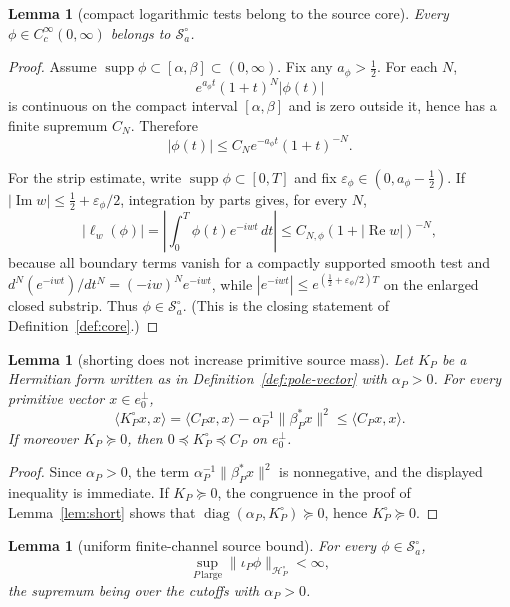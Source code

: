 \documentclass[11pt]{amsart}
\newtheorem{lemma}[theorem]{Lemma}
\theoremstyle{definition}
\theoremstyle{remark}
\theoremstyle{definition}
\renewcommand{\Re}{\operatorname{Re}}
\renewcommand{\Im}{\operatorname{Im}}
\newcommand{\half}{\tfrac{1}{2}}
\newcommand{\eps}{\varepsilon}
\newcommand{\cH}{\mathcal{H}}
\newcommand{\cS}{\mathcal{S}}
\begin{document}
\begin{lemma}[compact logarithmic tests belong to the source core]\label{lem:compact-core}
Every $\phi\in C_c^\infty(0,\infty)$ belongs to $\cS_a^\circ$.
\end{lemma}

\begin{proof}
Assume $\operatorname{supp}\phi\subset[\alpha,\beta]\subset(0,\infty)$.  Fix any
$a_\phi>\half$.  For each $N$,
\[
   e^{a_\phi t}(1+t)^N|\phi(t)|
\]
is continuous on the compact interval $[\alpha,\beta]$ and is zero outside it, hence has a finite
supremum $C_N$.  Therefore
\[
   |\phi(t)|\le C_Ne^{-a_\phi t}(1+t)^{-N}.
\]

For the strip estimate, write $\operatorname{supp}\phi\subset[0,T]$ and fix
$\eps_\phi\in(0,a_\phi-\half)$.  If $|\Im w|\le\half+\eps_\phi/2$, integration by parts gives, for
every $N$,
\[
   |\ell_w(\phi)|
   =
   \left|\int_0^T\phi(t)e^{-iwt}\,dt\right|
   \le
   C_{N,\phi}(1+|\Re w|)^{-N},
\]
because all boundary terms vanish for a compactly supported smooth test and
${d^N}(e^{-iwt})/{dt^N}=(-iw)^Ne^{-iwt}$, while
$|e^{-iwt}|\le e^{(\half+\eps_\phi/2)T}$ on the enlarged closed substrip.  Thus
$\phi\in\cS_a^\circ$.  (This is the closing statement of Definition~\ref{def:core}.)
\end{proof}

\begin{lemma}[shorting does not increase primitive source mass]\label{lem:shorting-monotone}
Let $K_P$ be a Hermitian form written as in Definition~\ref{def:pole-vector} with $\alpha_P>0$.  For
every primitive vector $x\in e_0^\perp$,
\[
   \langle K_P^\circ x,x\rangle
   =
   \langle C_Px,x\rangle-\alpha_P^{-1}\|\beta_P^*x\|^2
   \le \langle C_Px,x\rangle.
\]
If moreover $K_P\succeq0$, then $0\preceq K_P^\circ\preceq C_P$ on $e_0^\perp$.
\end{lemma}

\begin{proof}
Since $\alpha_P>0$, the term $\alpha_P^{-1}\|\beta_P^*x\|^2$ is nonnegative, and the displayed
inequality is immediate.  If $K_P\succeq0$, the congruence in the proof of Lemma~\ref{lem:short} shows
that $\operatorname{diag}(\alpha_P,K_P^\circ)\succeq0$, hence $K_P^\circ\succeq0$.
\end{proof}

\begin{lemma}[uniform finite-channel source bound]\label{lem:sourcebound}
For every $\phi\in\cS_a^\circ$,
\[
   \sup_{P\ \text{large}}\|\iota_P\phi\|_{\cH_P^\circ}<\infty,
\]
the supremum being over the cutoffs with $\alpha_P>0$.
\end{lemma}
\end{document}
